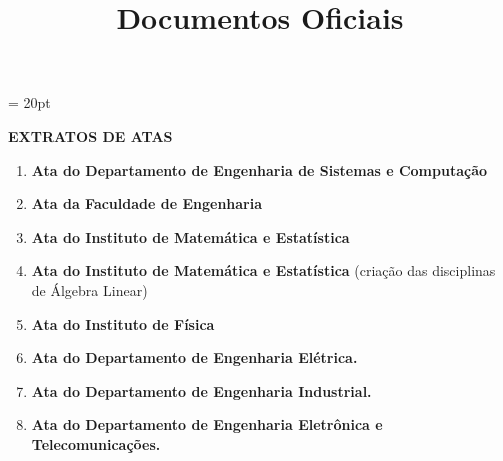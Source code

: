 \documentclass[12pt,a4paper]{article}
\title{Documentos Oficiais}
\begin{document}
\thispagestyle{firstpage} %
\headsep = 20pt
\setlength{\parindent}{0cm} %
\setlength{\tabcolsep}{5pt} %
\vspace*{2.0cm}

\textbf{EXTRATOS DE ATAS}

\begin{enumerate}
  \item \textbf{Ata do Departamento de Engenharia de Sistemas e Computação}  \\
  \item \textbf{Ata da Faculdade de Engenharia}  \\
  \item \textbf{Ata do Instituto de Matemática e Estatística}  \\
  \item \textbf{Ata do Instituto de Matemática e Estatística} (criação das disciplinas de Álgebra Linear) \\
  \item \textbf{Ata do Instituto de Física}  \\
  \item \textbf{Ata do Departamento de Engenharia Elétrica.}  \\
  \item \textbf{Ata do Departamento de Engenharia Industrial.}  \\
  \item \textbf{Ata do Departamento de Engenharia Eletrônica e Telecomunicações.}  \\
\end{enumerate}
\end{document}
